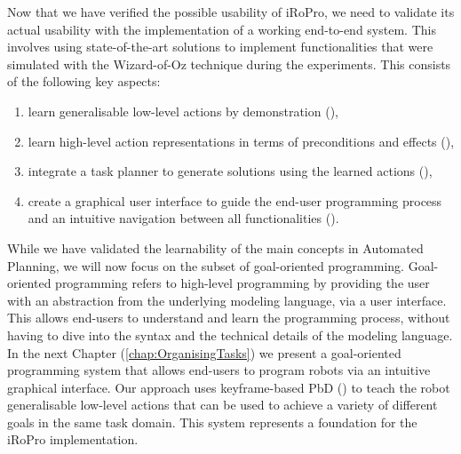 Now that we have verified the possible usability of iRoPro, we need to validate its actual usability with the implementation of a working end-to-end system.
This involves using state-of-the-art solutions to implement functionalities that were simulated with the Wizard-of-Oz technique during the experiments. 
This consists of the following key aspects: 
\begin{enumerate}
	\item learn generalisable low-level actions by demonstration (\eg \cite{akgun2012keyframe,pastor2009learning}),
	\item learn high-level action representations in terms of preconditions and effects (\eg \cite{abdo2013learning,mollard2015robot}),
	\item integrate a task planner to generate solutions using the learned actions (\eg \cite{abdo2013learning}),
	\item create a graphical user interface to guide the end-user programming process and an intuitive navigation between all functionalities  (\eg \cite{alexandrova2014robot,huang2017code3}).
\end{enumerate}

While we have validated the learnability of the main concepts in Automated Planning, we will now focus on the subset of goal-oriented programming. 
Goal-oriented programming refers to high-level programming by providing the user with an abstraction from the underlying modeling language, \eg via a user interface.
This allows end-users to understand and learn the programming process, without having to dive into the syntax and the technical details of the modeling language.
In the next Chapter (\ref{chap:OrganisingTasks}) we present a goal-oriented programming system that allows end-users to program robots via an intuitive graphical interface.
Our approach uses keyframe-based PbD (\cite{akgun2012keyframe}) to teach the robot generalisable low-level actions that can be used to achieve a variety of different goals in the same task domain.
This system represents a foundation for the iRoPro implementation.